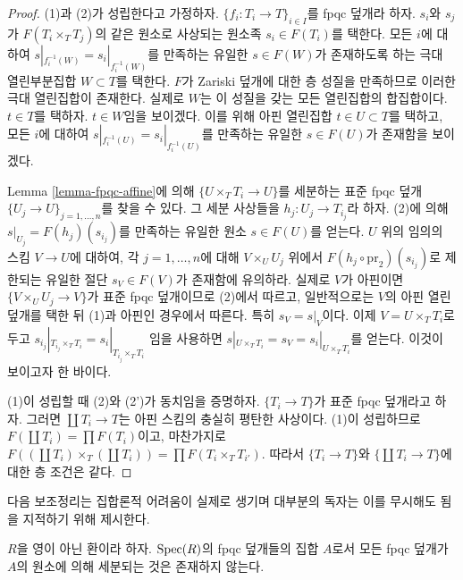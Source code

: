 \begin{proof}
(1)과 (2)가 성립한다고 가정하자.
$\{f_i : T_i \to T\}_{i \in I}$를 fpqc 덮개라 하자. $s_i$와 $s_j$가
$F(T_i \times_T T_j)$의 같은 원소로 사상되는 원소족
$s_i \in F(T_i)$를 택한다. 모든 $i$에 대하여
$s|_{f_i^{-1}(W)} = s_i|_{f_i^{-1}(W)}$를 만족하는 유일한
$s \in F(W)$가 존재하도록 하는 극대 열린부분집합 $W \subset T$를 택한다.
$F$가 Zariski 덮개에 대한 층 성질을 만족하므로 이러한 극대 열린집합이
존재한다. 실제로 $W$는 이 성질을 갖는 모든 열린집합의 합집합이다.
$t \in T$를 택하자. $t \in W$임을 보이겠다. 이를 위해 아핀 열린집합
$t \in U \subset T$를 택하고, 모든 $i$에 대하여
$s|_{f_i^{-1}(U)} = s_i|_{f_i^{-1}(U)}$를 만족하는 유일한
$s \in F(U)$가 존재함을 보이겠다.

\medskip\noindent
Lemma \ref{lemma-fpqc-affine}에 의해 $\{U \times_T T_i \to U\}$를
세분하는 표준 fpqc 덮개 $\{U_j \to U\}_{j = 1, \ldots, n}$를 찾을 수
있다. 그 세분 사상들을 $h_j : U_j \to T_{i_j}$라 하자. (2)에 의해
$s|_{U_j} = F(h_j)(s_{i_j})$를 만족하는 유일한 원소 $s \in F(U)$를
얻는다. $U$ 위의 임의의 스킴 $V \to U$에 대하여, 각
$j = 1, \ldots, n$에 대해 $V \times_U U_j$ 위에서
$F(h_j \circ \text{pr}_2)(s_{i_j})$로 제한되는 유일한 절단
$s_V \in F(V)$가 존재함에 유의하라. 실제로 $V$가 아핀이면
$\{V \times_U U_j \to V\}$가 표준 fpqc 덮개이므로 (2)에서 따르고,
일반적으로는 $V$의 아핀 열린 덮개를 택한 뒤 (1)과 아핀인 경우에서
따른다. 특히 $s_V = s|_V$이다. 이제 $V = U \times_T T_i$로 두고
$s_{i_j}|_{T_{i_j} \times_T T_i} = s_i|_{T_{i_j} \times_T T_i}$
임을 사용하면 $s|_{U \times_T T_i} = s_V = s_i|_{U \times_T T_i}$를
얻는다. 이것이 보이고자 한 바이다.

\medskip\noindent
(1)이 성립할 때 (2)와 (2')가 동치임을 증명하자.
$\{T_i \to T\}$가 표준 fpqc 덮개라고 하자. 그러면
$\coprod T_i \to T$는 아핀 스킴의 충실히 평탄한 사상이다. (1)이
성립하므로 $F(\coprod T_i) = \prod F(T_i)$이고, 마찬가지로
$F((\coprod T_i) \times_T (\coprod T_i)) = \prod F(T_i \times_T T_{i'})$.
따라서 $\{T_i \to T\}$와 $\{\coprod T_i \to T\}$에 대한 층 조건은
같다.
\end{proof}

\noindent
다음 보조정리는 집합론적 어려움이 실제로 생기며 대부분의 독자는 이를
무시해도 됨을 지적하기 위해 제시한다.

\begin{lemma}
\label{lemma-no-set-of-fpqc-covers-is-initial}
$R$을 영이 아닌 환이라 하자. $\mathop{\mathrm{Spec}}(R)$의 fpqc 덮개들의 집합 $A$로서
모든 fpqc 덮개가 $A$의 원소에 의해 세분되는 것은 존재하지 않는다.
\end{lemma}


